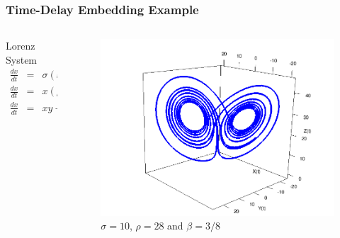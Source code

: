 \documentclass{beamer}
\begin{document}
% 



 \begin{frame}
 \frametitle{Time-Delay Embedding Example }
   
  \begin{columns}[onlytextwidth]
    \begin{column}{0.3\textwidth}
Lorenz System
 \begin{eqnarray*} 
  \frac{dx}{dt} &=&\sigma (x-y), \\
  \frac{dx}{dt} &=&x (\rho -z) - y, \\ 
  \frac{dx}{dt} &=&xy - \beta z.
 \end{eqnarray*}
 \end{column} 
  
  \begin{column}{0.63\textwidth}
       \begin{figure}
 \includegraphics[scale=.25]{lorenzattractor}
  \caption{$\sigma=10$, $\rho=28$ and $\beta=3/8$}
       \end{figure}
     \end{column}
  \end{columns}
 \end{frame}
\end{document}
